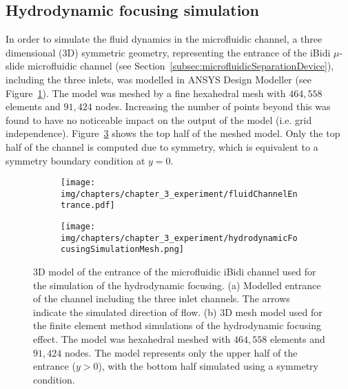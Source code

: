 \subsection{Hydrodynamic focusing simulation}\label{subsec:hydrodynamicFocusingSimulation}
In order to simulate the fluid dynamics in the microfluidic channel, a three dimensional (3D) symmetric geometry, representing the entrance of the iBidi $\mu$-slide microfluidic channel (see Section~\ref{subsec:microfluidicSeparationDevice}), including the three inlets, was modelled in ANSYS Design Modeller (see Figure~\ref{fig:hydrodynamicFocusingSimulation}). The model was meshed by a fine hexahedral mesh with $464,558$ elements and $91,424$ nodes. Increasing the number of points beyond this was found to have no noticeable impact on the output of the model (i.e. grid independence). Figure~\ref{fig:hydrodynamicFocusingSimulationMesh} shows the top half of the meshed model. Only the top half of the channel is computed due to symmetry, which is equivalent to a symmetry boundary condition at $y=0$.

\begin{figure}[htb]
        \centering
        \begin{subfigure}[b]{0.35\textwidth}
                \texttt{[image: img/chapters/chapter\_3\_experiment/fluidChannelEntrance.pdf]}
                \caption{}
                \label{fig:hydrodynamicFocusingSimulation}  
        \end{subfigure}
        \hfill
        \begin{subfigure}[b]{0.55\textwidth}
                \texttt{[image: img/chapters/chapter\_3\_experiment/hydrodynamicFocusingSimulationMesh.png]}
                \caption{}    
                \label{fig:hydrodynamicFocusingSimulationMesh}            
        \end{subfigure}
        \caption[3D model of entrance of the microfluidic iBidi channel]{3D model of the entrance of the microfluidic iBidi channel used for the simulation of the hydrodynamic focusing. (a) Modelled entrance of the channel including the three inlet channels. The arrows indicate the simulated direction of flow. (b) 3D mesh model used for the finite element method simulations of the hydrodynamic focusing effect. The model was hexahedral meshed with $464,558$ elements and $91,424$ nodes. The model represents only the upper half of the entrance ($y>0$), with the bottom half simulated using a symmetry condition.}
\end{figure}

